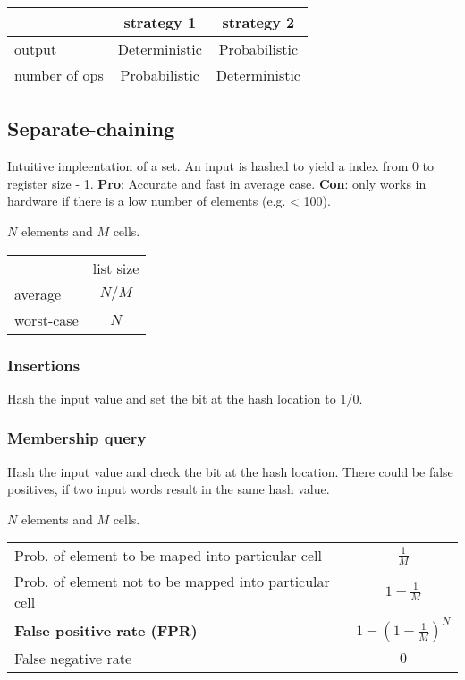 \documentclass[a4paper, fontsize=8pt, landscape, DIV=1]{scrartcl}
\begin{document}
\begin{multicols*}{4}
  \begin{center}
  \begin{tabular}{l | c | c }
    {} & strategy 1 & strategy 2 \\ \hline
    output & Deterministic & Probabilistic \\
    number of ops & Probabilistic & Deterministic
  \end{tabular}
  \end{center}

  \subsection{Separate-chaining}
  Intuitive impleentation of a set. An input is hashed to yield a index from 0 to
  register size - 1. \textbf{Pro}: Accurate and fast in average case. \textbf{Con}:
  only works in hardware if there is a low number of elements (e.g. < 100).

  $N$ elements and $M$ cells.
  \begin{center}
  \begin{tabular}{l  c }
    {} & list size \\
    average & $N/M$ \\
    worst-case & $N$
  \end{tabular}
  \end{center}

  \subsubsection{Insertions}
  Hash the input value and set the bit at the hash location to $1$/$0$.
  \subsubsection{Membership query}
  Hash the input value and check the bit at the hash location. There could be
  false positives, if two input words result in the same hash value.

  $N$ elements and $M$ cells.
  \begin{center}
  \begin{tabularx}{\columnwidth}{X c}
  Prob. of element to be maped into particular cell & $\frac{1}{M}$ \\
  Prob. of element not to be mapped into particular cell & $1-\frac{1}{M}$ \\
  \textbf{False positive rate (FPR)} & $1 - (1-\frac{1}{M})^N$ \\
  False negative rate & $0$
  \end{tabularx}
  \end{center}


\end{multicols*}
\end{document}
